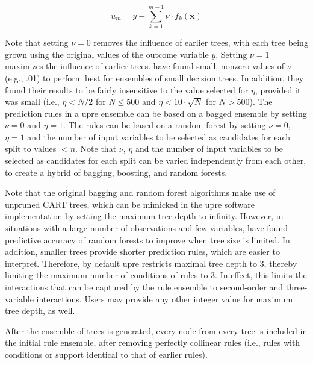 \documentclass[nobf,doc]{apa}
\begin{document}
\begin{equation}
	u_m  = y - \sum_{k=1}^{m-1}{\nu \cdot f_k(\mathbf{x})} 
\end{equation}
	
Note that setting $\nu = 0$ removes the influence of earlier trees, with each tree being grown using the original values of the outcome variable $y$. Setting $\nu = 1$ maximizes the influence of earlier trees.  have found small, nonzero values of $\nu$ (e.g., .01) to perform best for ensembles of small decision trees. In addition, they found their results to be fairly insensitive to the value selected for $\eta$, provided it was small (i.e., $\eta < N/2$ for $N \leq 500$ and $\eta < 10 \cdot \sqrt{N}$ for $N > 500$). The prediction rules in a upre ensemble can be based on a bagged ensemble by setting $\nu = 0$ and $\eta = 1$. The rules can be based on a random forest by setting $\nu = 0$, $\eta = 1$ and the number of input variables to be selected as candidates for each split to values $< n$. Note that $\nu$, $\eta$ and the number of input variables to be selected as candidates for each split can be varied independently from each other, to create a hybrid of bagging, boosting, and random forests.

Note that the original bagging and random forest algorithms make use of unpruned CART trees, which can be mimicked in the upre software implementation by setting the maximum tree depth to infinity. However, in situations with a large number of observations and few variables,  have found predictive accuracy of random forests to improve when tree size is limited. In addition, smaller trees provide shorter prediction rules, which are easier to interpret. Therefore, by default upre restricts maximal tree depth to 3, thereby limiting the maximum number of conditions of rules to 3. In effect, this limits the interactions that can be captured by the rule ensemble to second-order and three-variable interactions. Users may provide any other integer value for maximum tree depth, as well.   

After the ensemble of trees is generated, every node from every tree is included in the initial rule ensemble, after removing perfectly collinear rules (i.e., rules with conditions or support identical to that of earlier rules). 

\end{document}
